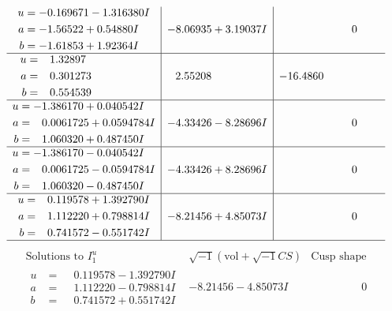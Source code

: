 \documentclass[1p]{elsarticle_modified}
\theoremstyle{definition}
\newcommand{\I}{\sqrt{-1}}
\begin{document}
$$\begin{array}{c|c|c}
\begin{aligned}
u &= -0.169671 - 1.316380 I \\
a &= -1.56522 + 0.54880 I \\
b &= -1.61853 + 1.92364 I\end{aligned}
 & -8.06935 + 3.19037 I & \phantom{-0.000000 } 0 \\ \hline\begin{aligned}
u &= \phantom{-}1.32897\phantom{ +0.000000I} \\
a &= \phantom{-}0.301273\phantom{ +0.000000I} \\
b &= \phantom{-}0.554539\phantom{ +0.000000I}\end{aligned}
 & \phantom{-}2.55208\phantom{ +0.000000I} & -16.4860\phantom{ +0.000000I} \\ \hline\begin{aligned}
u &= -1.386170 + 0.040542 I \\
a &= \phantom{-}0.0061725 + 0.0594784 I \\
b &= \phantom{-}1.060320 + 0.487450 I\end{aligned}
 & -4.33426 - 8.28696 I & \phantom{-0.000000 } 0 \\ \hline\begin{aligned}
u &= -1.386170 - 0.040542 I \\
a &= \phantom{-}0.0061725 - 0.0594784 I \\
b &= \phantom{-}1.060320 - 0.487450 I\end{aligned}
 & -4.33426 + 8.28696 I & \phantom{-0.000000 } 0 \\ \hline\begin{aligned}
u &= \phantom{-}0.119578 + 1.392790 I \\
a &= \phantom{-}1.112220 + 0.798814 I \\
b &= \phantom{-}0.741572 - 0.551742 I\end{aligned}
 & -8.21456 + 4.85073 I & \phantom{-0.000000 } 0\\
 \hline 
 \end{array}$$\newpage$$\begin{array}{c|c|c}  
\text{Solutions to }I^u_{1}& \I (\text{vol} + \sqrt{-1}CS) & \text{Cusp shape}\\
 \hline 
\begin{aligned}
u &= \phantom{-}0.119578 - 1.392790 I \\
a &= \phantom{-}1.112220 - 0.798814 I \\
b &= \phantom{-}0.741572 + 0.551742 I\end{aligned}
 & -8.21456 - 4.85073 I & \phantom{-0.000000 } 0 \\ \hline\begin{aligned}

\end{aligned}
\end{array}$$
\end{document}
